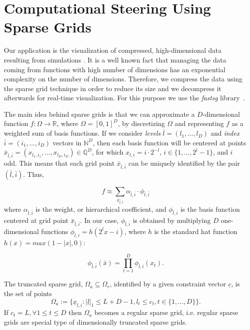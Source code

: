 \section{Computational Steering Using Sparse Grids}
\label{sec:comp_steering}

Our application is the visualization of compressed, high-dimensional data
resulting from simulations \cite{Butnaru201156}. It is a well known fact that
managing the data coming from functions with high number of dimensions has an
exponential complexity on the number of dimensions. Therefore, we compress the
data using the sparse grid technique in order to reduce its size and we
decompress it afterwards for real-time visualization. For this purpose we use
the \textit{fastsg} library~\cite{murarasu12fastsg:}.

The main idea behind sparse grids is that we can approximate a $D$-dimensional
function $f : \Omega \rightarrow \mathbb{R}$, where $\Omega = [0, 1]^{D}$, by
discretizing $\Omega$ and representing $f$ as a weighted sum of basis functions.
If we consider \textit{levels} $\bar{l} = (l_{1},\ldots,l_{D})$ and
\textit{index} $\bar{i} = (i_{1},\ldots,i_{D})$ vectors in $\mathbb{N}^{D}$,
then each basis function will be centered at points $\bar{x}_{\bar{l},\bar{i}} =
(x_{l_{1},i_{1}},\ldots,x_{l_{D},i_{D}}) \in \mathbb{Q}^{D}$, for which $x_{l,i}
= i \cdot 2^{-l}$, $i \in \{1,\ldots,2^{l} - 1\}$, and $i$ odd. This means that
each grid point $\bar{x}_{\bar{l},\bar{i}}$ can be uniquely identified by the
pair $(\bar{l},\bar{i})$. Thus,

\[ f \approx \sum_{\bar{x}_{\bar{l},\bar{i}}} \alpha_{\bar{l},\bar{i}} \cdot
\phi_{\bar{l},\bar{i}} \]
where $\alpha_{\bar{l},\bar{i}}$ is the weight, or hierarchical coefficient, and
$\phi_{\bar{l},\bar{i}}$ is the basis function centered at grid point
$\bar{x}_{\bar{l},\bar{i}}$. In our case, $\phi_{\bar{l},\bar{i}}$ is obtained
by multiplying $D$ one-dimensional functions $\phi_{l,i} = h(2^{l}x - i)$, where
$h$ is the standard hat function $h(x) = max(1 - |x|, 0)$:

\[ \phi_{\bar{l},\bar{i}}(\bar{x}) = \prod_{t=1}^{D} \phi_{l,i}(x_{t}) .\]

The truncated sparse grid, $\Omega_a \subseteq \Omega_r$, identified by a given constraint vector $\underline{c}$, is the set of points
\begin{equation*}
\Omega_a := \{\underline{x}_{\underline{l}, \underline{i}} : |\underline{l}|_1 \leq L + D - 1, l_t \leq c_t,  t \in \{1, \dots, D\}\}.
\end{equation*}
If $c_t = L, \forall 1 \leq t \leq D$ then $\Omega_a$ becomes a regular sparse grid, i.e. regular sparse grids are special type of dimensionally truncated sparse grids.



